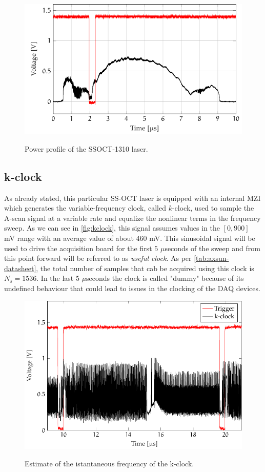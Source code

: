 \begin{figure}[hbt]
	\myfloatalign
	{\includegraphics[width=0.8\linewidth]{gfx/ch3/power-profile}}\\
	\caption{Power profile of the SSOCT-1310 laser.}\label{fig:axsun-power}
\end{figure}


\subsection{k-clock}
As already stated, this particular SS-OCT laser is equipped with an internal \ac{MZI} which generates the variable-frequency clock, called $k$-clock, used to sample the A-scan signal at a variable rate and equalize the nonlinear terms in the frequency sweep. As we can see in \autoref{fig:kclock}, this signal assumes values in the $[0, 900]$ mV range with an average value of about 460 mV. This sinusoidal signal will be used to drive the acquisition board for the first $5$ $\mu$seconds of the sweep and from this point forward will be referred to as \emph{useful clock}. As per \autoref{tab:axsun-datasheet}, the total number of samples that cab be acquired using this clock is $N_s = 1536$. In the last 5 $\mu$seconds the clock is called "dummy" because of its undefined behaviour that could lead to issues in the clocking of the \ac{DAQ} devices.

\begin{figure}[hbt]
	\myfloatalign
	{\includegraphics[width=0.8\linewidth]{gfx/ch3/clock}}\\
	\caption{Estimate of the istantaneous frequency of the k-clock.}\label{fig:kclock}
\end{figure}

